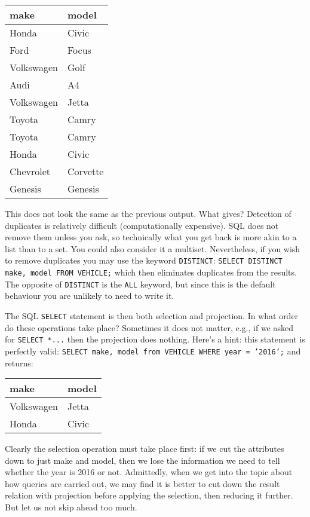 \begin{center}
\begin{tabular}{|l|l|} \hline
	\textbf{make} & \textbf{model} \\ \hline
	Honda & Civic \\ \hline
	Ford & Focus \\ \hline
	Volkswagen & Golf \\ \hline
	Audi & A4  \\ \hline
	Volkswagen & Jetta \\ \hline
	Toyota & Camry  \\ \hline
	Toyota & Camry  \\ \hline
	Honda & Civic  \\ \hline
	Chevrolet & Corvette  \\ \hline
	 Genesis & Genesis \\ \hline
\end{tabular}
\end{center}

This does not look the same as the previous output. What gives? Detection of duplicates is relatively difficult (computationally expensive). SQL does not remove them unless you ask, so technically what you get back is more akin to a list than to a set. You could also consider it a multiset.  Nevertheless, if you wish to remove duplicates you may use the keyword \texttt{DISTINCT}: \texttt{SELECT DISTINCT make, model FROM VEHICLE;} which then eliminates duplicates from the results. The opposite of \texttt{DISTINCT} is the \texttt{ALL} keyword, but since this is the default behaviour you are unlikely to need to write it.

The SQL \texttt{SELECT} statement is then both selection and projection. In what order do these operations take place? Sometimes it does not matter, e.g., if we asked for \texttt{SELECT *...} then the projection does nothing. Here's a hint: this statement is perfectly valid: \texttt{SELECT make, model from VEHICLE WHERE year = '2016';} and returns: 

\begin{center}
\begin{tabular}{|l|l|} \hline
\textbf{make} & \textbf{model} \\ \hline
	Volkswagen & Jetta  \\ \hline
	Honda & Civic \\ \hline
\end{tabular}
\end{center}

Clearly the selection operation must take place first: if we cut the attributes down to just make and model, then we lose the information we need to tell whether the year is 2016 or not. Admittedly, when we get into the topic about how queries are carried out, we may find it is better to cut down the result relation with projection before applying the selection, then reducing it further. But let us not skip ahead too much.  

